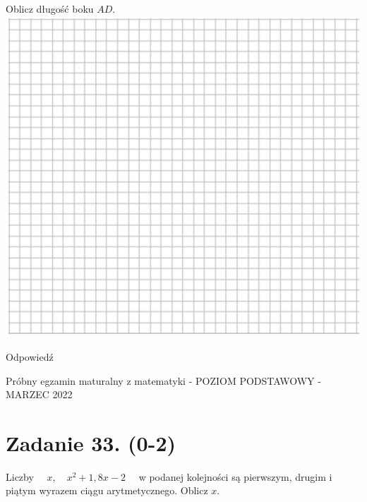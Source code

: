 \documentclass[10pt]{article}
\begin{document}
Oblicz długość boku \(A D\).\\
\includegraphics[max width=\textwidth, center]{2024_11_21_fd555512e32c497e8a5dg-16(1)}

Odpowiedź

Próbny egzamin maturalny z matematyki - POZIOM PODSTAWOWY - MARZEC 2022

\section*{Zadanie 33. (0-2)}
Liczby \(\quad x, \quad x^{2}+1,8 x-2 \quad\) w podanej kolejności są pierwszym, drugim i piątym wyrazem ciągu arytmetycznego. Oblicz \(x\).
\end{document}

